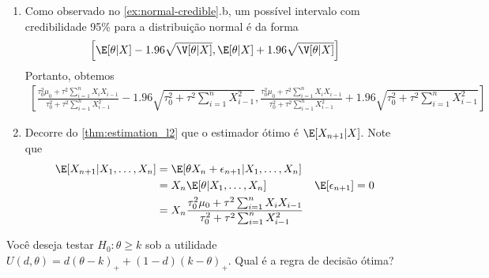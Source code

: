 {\begin{enumerate}[label=(\alph*)]
  \item Como observado no \cref{ex:normal-credible}.b, 
  um possível intervalo com credibilidade 95\% para 
  a distribuição normal é da forma
  \begin{align*}
   \left[\E[\theta|X]-1.96\sqrt{\V[\theta|X]},
   \E[\theta|X]+1.96\sqrt{\V[\theta|X]}\right]
  \end{align*}
  Portanto, obtemos
  \begin{align*}
   \left[\frac{\tau^{2}_0\mu_{0}+\tau^{2}\sum_{i=1}^{n}{X_{i}X_{i-1}}}{\tau_{0}^{2}+\tau^{2}\sum_{i=1}^{n}{X_{i-1}^{2}}}-1.96\sqrt{\tau_{0}^{2}+\tau^{2}\sum_{i=1}^{n}{X_{i-1}^{2}}},\frac{\tau^{2}_0\mu_{0}+\tau^{2}\sum_{i=1}^{n}{X_{i}X_{i-1}}}{\tau_{0}^{2}+\tau^{2}\sum_{i=1}^{n}{X_{i-1}^{2}}}+1.96\sqrt{\tau_{0}^{2}+\tau^{2}\sum_{i=1}^{n}{X_{i-1}^{2}}}\right]
  \end{align*}
  
  \item Decorre do  \cref{thm:estimation_l2}
  que o estimador ótimo é $\E[X_{n+1}|X]$. 
  Note que
  \begin{align*}
   \E[X_{n+1}|X_{1},\ldots,X_{n}]	
   &= \E[\theta X_{n} + \epsilon_{n+1}|X_{1},\ldots,X_{n}] \\
   &= X_{n}\E[\theta|X_{1},\ldots,X_{n}] & \E[\epsilon_{n+1}] 
   = 0 \\
   &= X_{n}\frac{\tau^{2}_0\mu_{0}+\tau^{2}\sum_{i=1}^{n}{X_{i}X_{i-1}}}{\tau_{0}^{2}+\tau^{2}\sum_{i=1}^{n}{X_{i-1}^{2}}}
  \end{align*}
 \end{enumerate}
}{}

\begin{exercise}
 Você deseja testar $H_{0}: \theta \geq k$
 sob a utilidade $U(d,\theta) = d(\theta-k)_{+} + (1-d)(k-\theta)_{+}$.
 Qual é a regra de decisão ótima?
\end{exercise}


